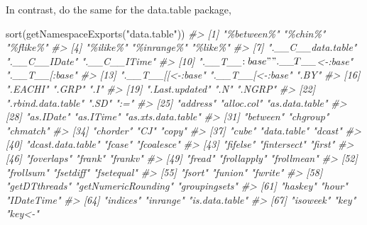 \documentclass[
]{book}
\newenvironment{Shaded}{\begin{snugshade}}{\end{snugshade}}
\newcommand{\CommentTok}[1]{\textcolor[rgb]{0.56,0.35,0.01}{\textit{#1}}}
\newcommand{\FunctionTok}[1]{\textcolor[rgb]{0.00,0.00,0.00}{#1}}
\newcommand{\NormalTok}[1]{#1}
\newcommand{\StringTok}[1]{\textcolor[rgb]{0.31,0.60,0.02}{#1}}
\begin{document}
In contrast, do the same for the data.table package,

\begin{Shaded}
\begin{Highlighting}[]
\FunctionTok{sort}\NormalTok{(}\FunctionTok{getNamespaceExports}\NormalTok{(}\StringTok{"data.table"}\NormalTok{))}
\CommentTok{\#\textgreater{}   [1] "\%between\%"          "\%chin\%"             "\%flike\%"           }
\CommentTok{\#\textgreater{}   [4] "\%ilike\%"            "\%inrange\%"          "\%like\%"            }
\CommentTok{\#\textgreater{}   [7] ".\_\_C\_\_data.table"   ".\_\_C\_\_IDate"        ".\_\_C\_\_ITime"       }
\CommentTok{\#\textgreater{}  [10] ".\_\_T\_\_$:base"       ".\_\_T\_\_$\textless{}{-}:base"     ".\_\_T\_\_[:base"      }
\CommentTok{\#\textgreater{}  [13] ".\_\_T\_\_[[\textless{}{-}:base"    ".\_\_T\_\_[\textless{}{-}:base"     ".BY"               }
\CommentTok{\#\textgreater{}  [16] ".EACHI"             ".GRP"               ".I"                }
\CommentTok{\#\textgreater{}  [19] ".Last.updated"      ".N"                 ".NGRP"             }
\CommentTok{\#\textgreater{}  [22] ".rbind.data.table"  ".SD"                ":="                }
\CommentTok{\#\textgreater{}  [25] "address"            "alloc.col"          "as.data.table"     }
\CommentTok{\#\textgreater{}  [28] "as.IDate"           "as.ITime"           "as.xts.data.table" }
\CommentTok{\#\textgreater{}  [31] "between"            "chgroup"            "chmatch"           }
\CommentTok{\#\textgreater{}  [34] "chorder"            "CJ"                 "copy"              }
\CommentTok{\#\textgreater{}  [37] "cube"               "data.table"         "dcast"             }
\CommentTok{\#\textgreater{}  [40] "dcast.data.table"   "fcase"              "fcoalesce"         }
\CommentTok{\#\textgreater{}  [43] "fifelse"            "fintersect"         "first"             }
\CommentTok{\#\textgreater{}  [46] "foverlaps"          "frank"              "frankv"            }
\CommentTok{\#\textgreater{}  [49] "fread"              "frollapply"         "frollmean"         }
\CommentTok{\#\textgreater{}  [52] "frollsum"           "fsetdiff"           "fsetequal"         }
\CommentTok{\#\textgreater{}  [55] "fsort"              "funion"             "fwrite"            }
\CommentTok{\#\textgreater{}  [58] "getDTthreads"       "getNumericRounding" "groupingsets"      }
\CommentTok{\#\textgreater{}  [61] "haskey"             "hour"               "IDateTime"         }
\CommentTok{\#\textgreater{}  [64] "indices"            "inrange"            "is.data.table"     }
\CommentTok{\#\textgreater{}  [67] "isoweek"            "key"                "key\textless{}{-}"             }

\end{Highlighting}
\end{Shaded}
\end{document}
